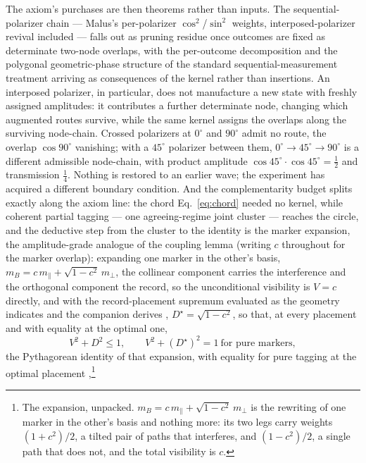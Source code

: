 The axiom's purchases are then theorems rather than inputs. The sequential-polarizer chain --- Malus's per-polarizer $\cos^2$/$\sin^2$ weights, interposed-polarizer revival included --- falls out as pruning residue once outcomes are fixed as determinate two-node overlaps, with the per-outcome decomposition and the polygonal geometric-phase structure of the standard sequential-measurement treatment arriving as consequences of the kernel rather than insertions. An interposed polarizer, in particular, does not manufacture a new state with freshly assigned amplitudes: it contributes a further determinate node, changing which augmented routes survive, while the same kernel assigns the overlaps along the surviving node-chain. Crossed polarizers at $0^\circ$ and $90^\circ$ admit no route, the overlap $\cos 90^\circ$ vanishing; with a $45^\circ$ polarizer between them, $0^\circ \to 45^\circ \to 90^\circ$ is a different admissible node-chain, with product amplitude $\cos 45^\circ \cdot \cos 45^\circ = \tfrac12$ and transmission $\tfrac14$. Nothing is restored to an earlier wave; the experiment has acquired a different boundary condition. And the complementarity budget splits exactly along the axiom line: the chord Eq.~\eqref{eq:chord} needed no kernel, while coherent partial tagging --- one agreeing-regime joint cluster --- reaches the circle, and the deductive step from the cluster to the identity is the marker expansion, the amplitude-grade analogue of the coupling lemma (writing $c$ throughout for the marker overlap): expanding one marker in the other's basis, $m_B = c\, m_{\parallel} + \sqrt{1-c^2}\, m_{\perp}$, the collinear component carries the interference and the orthogonal component the record, so the unconditional visibility is $V = c$ directly, and with the record-placement supremum evaluated as the geometry indicates and the companion derives \cite{Aethus}, $D^{\star} = \sqrt{1-c^2}$, so that, at every placement and with equality at the optimal one,
\begin{equation}\label{eq:circle}
V^2 + D^2 \le 1, \qquad V^2 + (D^{\star})^2 = 1 \ \text{for pure markers},
\end{equation}
the Pythagorean identity of that expansion, with equality for pure tagging at the optimal placement \cite{greenberger1988, englert1996},\footnote{The expansion, unpacked. $m_B = c\, m_{\parallel} + \sqrt{1-c^2}\, m_{\perp}$ is the rewriting of one marker in the other's basis and nothing more: its two legs carry weights $(1 + c^2)/2$, a tilted pair of paths that interferes, and $(1 - c^2)/2$, a single path that does not, and the total visibility is $c$.}

